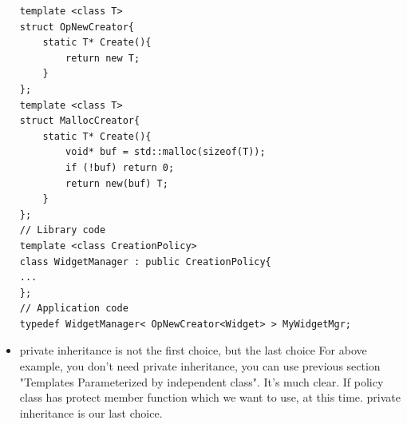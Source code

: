\documentclass[a4paper,11pt,twoside]{book}
\begin{document}
\begin{itemize}
\begin{lstlisting}[numbers=none]
template <class T>
struct OpNewCreator{
	static T* Create(){
		return new T;
	}
};
template <class T>
struct MallocCreator{
	static T* Create(){
		void* buf = std::malloc(sizeof(T));
		if (!buf) return 0;
		return new(buf) T;
	}
}; 
// Library code
template <class CreationPolicy>
class WidgetManager : public CreationPolicy{
...
}; 
// Application code
typedef WidgetManager< OpNewCreator<Widget> > MyWidgetMgr; 
\end{lstlisting}

    \item private inheritance is not the first choice, but the last choice For above example, you don't need private inheritance, you can use previous section "Templates Parameterized by independent class". It's much clear. If policy class has protect member function which we want to use, at this time. private inheritance is our last choice. 

\end{itemize}
\end{document}
